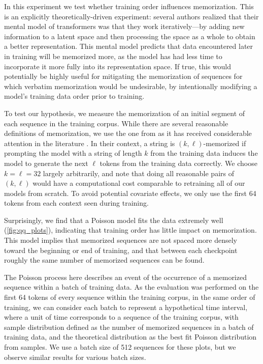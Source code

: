 In this experiment we test whether training order influences memorization. This is an explicitly theoretically-driven experiment: several authors realized that their mental model of transformers was that they work iteratively---by adding new information to a latent space and then processing the space as a whole to obtain a better representation. This mental model predicts that data encountered later in training will be memorized more, as the model has had less time to incorporate it more fully into its representation space. If true, this would potentially be highly useful for mitigating the memorization of sequences for which verbatim memorization would be undesirable, by intentionally modifying a model's training data order prior to training. 

To test our hypothesis, we measure the memorization of an initial segment of each sequence in the training corpus. While there are several reasonable definitions of memorization, we use the one from \citet{carlini2021extracting} as it has received considerable attention in the literature \citep{yoon2021model,huang2022large,ginart2022submix,ippolito2022preventing,biderman2023emergent}. In their context, a string is $(k,\ell)$-memorized if prompting the model with a string of length $k$ from the training data induces the model to generate the next $\ell$ tokens from the training data correctly. We choose $k=\ell=32$ largely arbitrarily, and note that doing all reasonable pairs of $(k,\ell)$ would have a computational cost comparable to retraining all of our models from scratch. To avoid potential covariate effects, we only use the first 64 tokens from each context seen during training.

Surprisingly, we find that a Poisson model fits the data extremely well (\ref{fig:qq_plots}), indicating that training order has little impact on memorization. This model implies that memorized sequences are not spaced more densely toward the beginning or end of training, and that between each checkpoint roughly the same number of memorized sequences can be found.

The Poisson process here describes an event of the occurrence of a memorized sequence within a batch of training data. As the evaluation was performed on the first 64 tokens of every sequence within the training corpus, in the same order of training, we can consider each batch to represent a hypothetical time interval, where a unit of time corresponds to a sequence of the training corpus, with sample distribution defined as the number of memorized sequences in a batch of training data, and the theoretical distribution as the best fit Poisson distribution from samples. We use a batch size of 512 sequences for these plots, but we observe similar results for various batch sizes.

